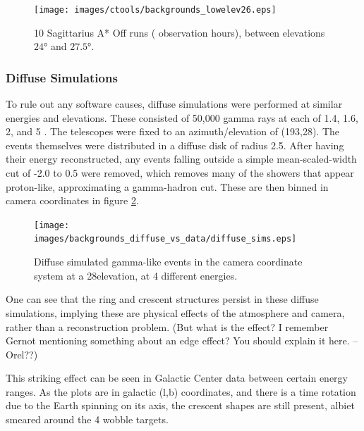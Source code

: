 \begin{figure}[ht]
  \begin{center}
    \texttt{[image: images/ctools/backgrounds\_lowelev26.eps]}
    \caption[CTOOLS Background at 26\degree Elevation]{10 Sagittarius A* Off runs ( observation hours), between elevations $ \ang{24} $ and $ \ang{27.5} $. }\label{fig:back_lowelev26}
  \end{center}
\end{figure}


\subsubsection{Diffuse Simulations}\label{subsubsec:diffusesims}

To rule out any software causes, diffuse simulations were performed at similar energies and elevations.
These consisted of 50,000 gamma rays at each of 1.4, 1.6, 2, and 5 \TeV.
The telescopes were fixed to an azimuth/elevation of (193\degree,28\degree).
The events themselves were distributed in a diffuse disk of radius 2.5\degree.
After having their energy reconstructed, any events falling outside a simple mean-scaled-width cut of -2.0 to 0.5 were removed, which removes many of the showers that appear proton-like, approximating a gamma-hadron cut.
These are then binned in camera coordinates in figure \ref{fig:back_simdiffuse}.

\begin{figure}[ht]
  \begin{center}
    \texttt{[image: images/backgrounds\_diffuse\_vs\_data/diffuse\_sims.eps]}
    \caption[Diffuse Simulated Backgrounds]{Diffuse simulated gamma-like events in the camera coordinate system at a 28\degree elevation, at 4 different energies.}\label{fig:back_simdiffuse}
  \end{center}
\end{figure}

One can see that the ring and crescent structures persist in these diffuse simulations, implying these are physical effects of the atmosphere and camera, rather than a reconstruction problem.
(But what is the effect? I remember Gernot mentioning something about an edge effect? You should explain it here. --Orel??)

This striking effect can be seen in Galactic Center data between certain energy ranges.
As the plots are in galactic (l,b) coordinates, and there is a time rotation due to the Earth spinning on its axis, the crescent shapes are still present, albiet smeared around the 4 wobble targets.

